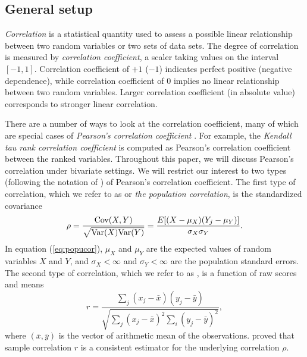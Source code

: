 \subsection{General setup}\label{subsec:generalsetup}
\textit{Correlation} is a statistical quantity used to assess a possible linear relationship 
between two random variables or two sets of data sets. The degree of correlation is measured by 
\textit{correlation coefficient}, a scaler taking values on the interval $[-1, 1]$. Correlation 
coefficient of $+1$ ($-1$) indicates perfect positive (negative dependence), while correlation 
coefficient of 0 implies no linear relationship between two random variables. Larger 
correlation coefficient (in absolute value) corresponds to stronger linear correlation. 

There are a number of ways to look at the correlation coefficient, many of which are special 
cases of \textit{Pearson's correlation coefficient} 
\citep{lee1988thirteen}. For example, the \textit{Kendall tau rank correlation coefficient} is 
computed as Pearson's correlation coefficient between the ranked variables. Throughout this 
paper, we will discuss Pearson's correlation under bivariate settings. We will restrict our 
interest to two types (following the notation of \citet{lee1988thirteen}) of Pearson's 
correlation coefficient.  The first type of correlation, which we refer to as 
\textit{\popucor} or \textit{the population correlation}, is the standardized 
covariance
\begin{equation}\label{eq:popucor}
\rho =\dfrac{\text{Cov}(X, Y)}{\sqrt{\text{Var}(X)\text{Var}(Y)}} = 
\dfrac{E[(X-\mu_X)(Y_j-\mu_Y)]}{\sigma_X\sigma_Y}.
\end{equation} 
In equation (\ref{eq:popucor}), $\mu_X$ and $\mu_Y$ are the expected values of 
random variables 
$X$ and 
$Y$,  and $\sigma_X<\infty$ and 
$\sigma_Y<\infty$ are the population standard errors. The second type of correlation, which we 
refer to as \textit{\samplecor}, is a function of raw scores and means
\begin{equation}\label{eq:samplecor}
r  =  \dfrac{\sum_j (x_j -\bar{x})(y_j - \bar{y})}{\sqrt{\sum_{j}(x_j - \bar{x})^2\sum_i(y_j - 
		\bar{y})^2}}, 
\end{equation}
where $(\bar{x}, \bar{y})$ is the vector of arithmetic mean of the observations. 
\citet{fisher1915frequency} proved that sample correlation $r$ is a consistent 
estimator for the underlying correlation $\rho$.

